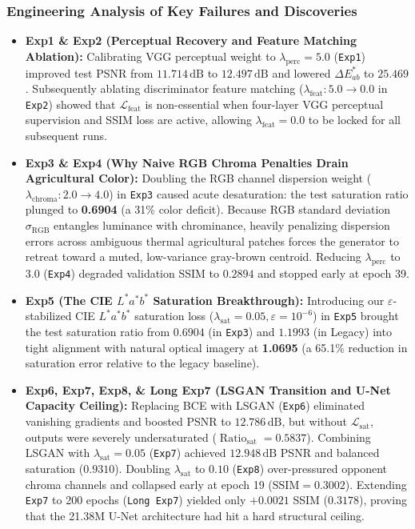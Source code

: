 \documentclass[10pt,a4paper,twoside]{article}
\begin{document}
\subsubsection{Engineering Analysis of Key Failures and Discoveries}
\begin{itemize}
    \item \textbf{Exp1 \& Exp2 (Perceptual Recovery and Feature Matching Ablation):} Calibrating VGG perceptual weight to $\lambda_{\mathrm{perc}} = 5.0$ (\texttt{Exp1}) improved test PSNR from $11.714\,\text{dB}$ to $12.497\,\text{dB}$ and lowered $\Delta E^*_{ab}$ to $25.469$. Subsequently ablating discriminator feature matching ($\lambda_{\mathrm{feat}}: 5.0 \to 0.0$ in \texttt{Exp2}) showed that $\mathcal{L}_{\mathrm{feat}}$ is non-essential when four-layer VGG perceptual supervision and SSIM loss are active, allowing $\lambda_{\mathrm{feat}} = 0.0$ to be locked for all subsequent runs.
    \item \textbf{Exp3 \& Exp4 (Why Naive RGB Chroma Penalties Drain Agricultural Color):} Doubling the RGB channel dispersion weight ($\lambda_{\mathrm{chroma}}: 2.0 \to 4.0$) in \texttt{Exp3} caused acute desaturation: the test saturation ratio plunged to \textbf{0.6904} (a 31\% color deficit). Because RGB standard deviation $\sigma_{\mathrm{RGB}}$ entangles luminance with chrominance, heavily penalizing dispersion errors across ambiguous thermal agricultural patches forces the generator to retreat toward a muted, low-variance gray-brown centroid. Reducing $\lambda_{\mathrm{perc}}$ to $3.0$ (\texttt{Exp4}) degraded validation SSIM to $0.2894$ and stopped early at epoch 39.
    \item \textbf{Exp5 (The CIE $L^*a^*b^*$ Saturation Breakthrough):} Introducing our $\varepsilon$-stabilized CIE $L^*a^*b^*$ saturation loss ($\lambda_{\mathrm{sat}} = 0.05, \varepsilon = 10^{-6}$) in \texttt{Exp5} brought the test saturation ratio from $0.6904$ (in \texttt{Exp3}) and $1.1993$ (in Legacy) into tight alignment with natural optical imagery at \textbf{1.0695} (a 65.1\% reduction in saturation error relative to the legacy baseline).
    \item \textbf{Exp6, Exp7, Exp8, \& Long Exp7 (LSGAN Transition and U-Net Capacity Ceiling):} Replacing BCE with LSGAN (\texttt{Exp6}) eliminated vanishing gradients and boosted PSNR to $12.786\,\text{dB}$, but without $\mathcal{L}_{\mathrm{sat}}$, outputs were severely undersaturated ($\operatorname{Ratio}_{\mathrm{sat}} = 0.5837$). Combining LSGAN with $\lambda_{\mathrm{sat}} = 0.05$ (\texttt{Exp7}) achieved $12.948\,\text{dB}$ PSNR and balanced saturation ($0.9310$). Doubling $\lambda_{\mathrm{sat}}$ to $0.10$ (\texttt{Exp8}) over-pressured opponent chroma channels and collapsed early at epoch 19 ($\text{SSIM} = 0.3002$). Extending \texttt{Exp7} to 200 epochs (\texttt{Long Exp7}) yielded only $+0.0021$ SSIM ($0.3178$), proving that the 21.38M U-Net architecture had hit a hard structural ceiling.

\end{itemize}
\end{document}
